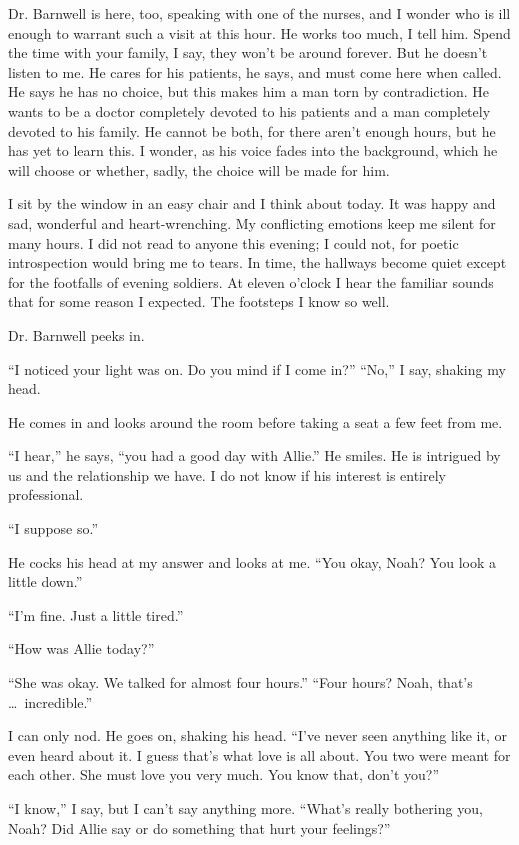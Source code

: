 \documentclass[10pt, twoside, openright]{book}
\begin{document}
Dr. Barnwell is here, too, speaking with one of the nurses, and I wonder
who is ill enough to warrant such a visit at this hour. He works too
much, I tell him. Spend the time with your family, I say, they won't be
around forever. But he doesn't listen to me. He cares for his patients,
he says, and must come here when called. He says he has no choice, but
this makes him a man torn by contradiction. He wants to be a doctor
completely devoted to his patients and a man completely devoted to his
family. He cannot be both, for there aren't enough hours, but he has yet
to learn this. I wonder, as his voice fades into the background, which
he will choose or whether, sadly, the choice will be made for him.

I sit by the window in an easy chair and I think about today. It was
happy and sad, wonderful and heart-wrenching. My conflicting emotions
keep me silent for many hours. I did not read to anyone this evening; I
could not, for poetic introspection would bring me to tears. In time,
the hallways become quiet except for the footfalls of evening soldiers.
At eleven o'clock I hear the familiar sounds that for some reason I
expected. The footsteps I know so well.


Dr. Barnwell peeks in.

``I noticed your light was on. Do you mind if I come in?'' ``No,'' I
say, shaking my head.


He comes in and looks around the room before taking a seat a few feet
from me.

``I hear,'' he says, ``you had a good day with Allie.'' He smiles. He is
intrigued by us and the relationship we have. I do not know if his
interest is entirely professional.


``I suppose so.''


He cocks his head at my answer and looks at me. ``You okay, Noah? You
look a little down.''


``I'm fine. Just a little tired.''

``How was Allie today?''


``She was okay. We talked for almost four hours.'' ``Four hours? Noah,
that's   \dots\ incredible.''

I can only nod. He goes on, shaking his head. ``I've never seen anything
like it, or even heard about it. I guess that's what love is all about.
You two were meant for each other. She must love you very much. You know
that, don't you?''

``I know,'' I say, but I can't say anything more. ``What's really
bothering you, Noah? Did Allie say or do something that hurt your
feelings?''
\end{document}
